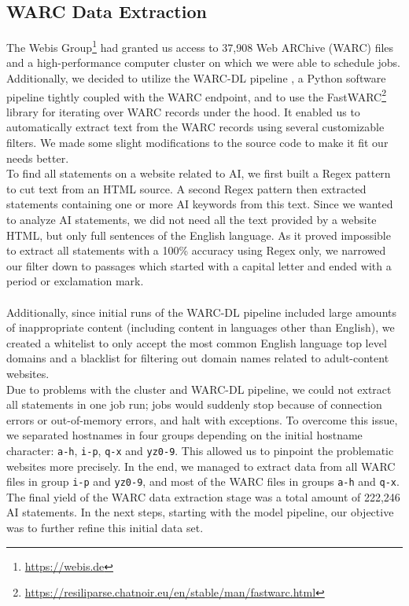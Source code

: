 \subsection{WARC Data Extraction}
The Webis Group\footnote{\url{https://webis.de}} had granted us  access to 37,908 Web ARChive (WARC) files and a high-performance computer cluster on which we were able to schedule jobs.
Additionally, we decided to utilize the WARC-DL pipeline \citep{Deckers2022}, a Python software pipeline tightly coupled with the WARC endpoint, and to use the FastWARC\footnote{\url{https://resiliparse.chatnoir.eu/en/stable/man/fastwarc.html}} library for iterating over WARC records under the hood.
It enabled us to automatically extract text  from the WARC records using several customizable filters.
We made some slight modifications to the source code to make it fit our needs better.
\\
To find all statements on a website related to AI, we first built a Regex pattern to cut text from an HTML source. A second Regex pattern then extracted statements containing one or more AI keywords from this text. Since we wanted to analyze AI statements, we did not need all the text provided by a website HTML, but only full sentences of the English language. 
As it proved impossible to extract all statements with a 100\% accuracy using Regex only, we narrowed our filter down to passages which started with a capital letter and ended with a period or exclamation mark.
\\
\\
Additionally, since initial runs of the WARC-DL pipeline included large amounts of inappropriate content (including content in languages other than English), we created a whitelist to only accept the most common English language top level domains and a blacklist for filtering out domain names related to adult-content websites. 
\\
Due to problems with the cluster and WARC-DL pipeline, we could not extract all statements in one job run; jobs would suddenly stop because of connection errors or out-of-memory errors, and halt with exceptions. To overcome this issue, we separated hostnames in four groups depending on the initial hostname character: \texttt{a-h}, \texttt{i-p}, \texttt{q-x} and \texttt{yz0-9}.
This allowed us to pinpoint the problematic websites more precisely. In the end, we managed to extract data from all WARC files in group \texttt{i-p} and \texttt{yz0-9}, and most of the WARC files in groups \texttt{a-h} and \texttt{q-x}.
The final yield of the WARC data extraction stage was a total amount of 222,246 AI statements.
In the next steps, starting with the model pipeline, our objective was to further refine this initial data set.

